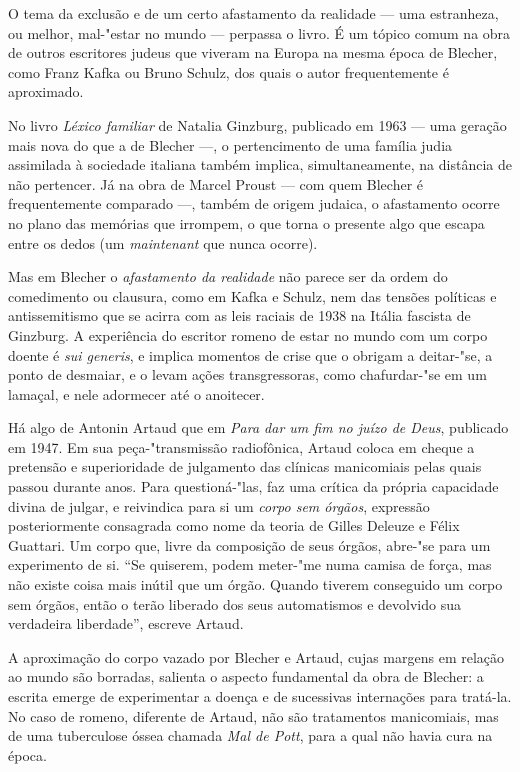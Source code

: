 O tema da exclusão e de um certo afastamento da realidade --- uma estranheza, ou melhor, mal-"estar no mundo --- perpassa o livro. É um tópico comum na obra de outros escritores judeus que viveram na Europa na mesma época de Blecher, como Franz Kafka ou Bruno Schulz, dos quais o autor frequentemente é aproximado. 

No livro \textit{Léxico familiar} de Natalia Ginzburg, publicado em 1963 --- uma geração mais nova do que a de Blecher ---, o pertencimento de uma família judia assimilada à sociedade italiana também implica, simultaneamente, na distância de não pertencer. Já na obra de Marcel Proust --- com quem Blecher é frequentemente comparado ---, também de origem judaica, o afastamento ocorre no plano das memórias que irrompem, o que torna o presente algo que escapa entre os dedos (um \textit{maintenant} que nunca ocorre). 

Mas em Blecher o \textit{afastamento da realidade} não parece ser da ordem do comedimento ou clausura, como em Kafka e Schulz, nem das tensões políticas e  antissemitismo que se acirra com as leis raciais de 1938 na Itália fascista de Ginzburg. A experiência do escritor romeno de estar no mundo com um corpo doente é \textit{sui generis}, e implica momentos de crise que o obrigam a deitar-"se, a ponto de desmaiar, e o levam ações transgressoras, como chafurdar-"se em um lamaçal, e nele adormecer até o anoitecer.

Há algo de Antonin Artaud que em \textit{Para dar um fim no juízo de Deus}, publicado em 1947. Em sua peça-"transmissão radiofônica, Artaud coloca em cheque a pretensão e superioridade de julgamento das clínicas manicomiais pelas quais passou durante anos. Para questioná-"las, faz uma crítica da própria capacidade divina de julgar, e reivindica para si um \textit{corpo sem órgãos}, expressão posteriormente consagrada como nome da teoria de Gilles Deleuze e Félix Guattari. Um corpo que, livre da composição de seus órgãos, abre-"se para um experimento de si. ``Se quiserem, podem meter-"me numa camisa de força, mas não existe coisa mais inútil que um órgão. Quando tiverem conseguido um corpo sem órgãos, então o terão liberado dos seus automatismos e devolvido sua verdadeira liberdade'', escreve Artaud.

A aproximação do corpo vazado por Blecher e Artaud, cujas margens em relação ao mundo são borradas, salienta o aspecto fundamental da obra de Blecher: a escrita emerge de experimentar a doença e de sucessivas internações para tratá-la. No caso de romeno, diferente de Artaud, não são tratamentos manicomiais, mas de uma tuberculose óssea chamada \textit{Mal de Pott}, para a qual não havia cura na época.

